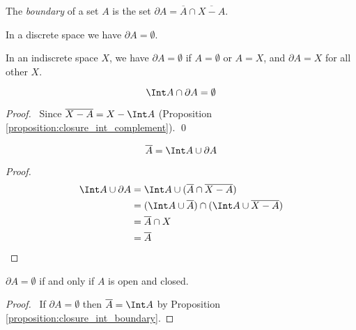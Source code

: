 \begin{definition}[Boundary]
    The \emph{boundary} of a set $A$ is the set $\partial A = \overline{A} \cap \overline{X - A}$.
\end{definition}

\begin{proposition}
    In a discrete space we have $\partial A = \emptyset$.
\end{proposition}

\begin{proposition}
    In an indiscrete space $X$, we have $\partial A = \emptyset$ if $A = \emptyset$ or $A = X$,
    and $\partial A = X$ for all other $X$.
\end{proposition}

\begin{proposition}
    \label{proposition:int_boundary_disjoint}
    \[ \Int A \cap \partial A = \emptyset \]
\end{proposition}

\begin{proof}
    \pf\ Since $\overline{X - A} = X - \Int A$ (Proposition \ref{proposition:closure_int_complement}). \qed
\end{proof}

\begin{proposition}
    \label{proposition:closure_int_boundary}
    \[ \overline{A} = \Int A \cup \partial A \]
\end{proposition}

\begin{proof}
    \pf
    \begin{align*}
        \Int A \cup \partial A & = \Int A \cup (\overline{A} \cap \overline{X - A}) \\
        & = (\Int A \cup \overline{A}) \cap (\Int A \cup \overline{X - A}) \\
        & = \overline{A} \cap X \\
        & = \overline{A}
    \end{align*}
\end{proof}

\begin{proposition}
    $\partial A = \emptyset$ if and only if $A$ is open and closed.
\end{proposition}

\begin{proof}
    \pf\ If $\partial A = \emptyset$ then $\overline{A} = \Int A$ by Proposition \ref{proposition:closure_int_boundary}.
\end{proof}

